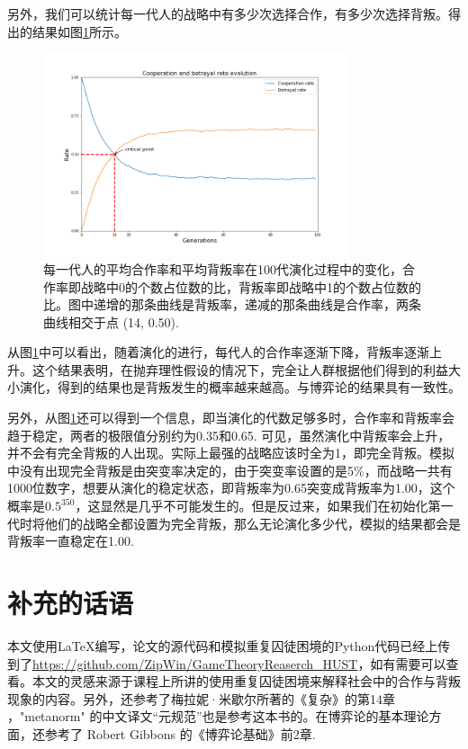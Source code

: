 \documentclass[lang=cn,11pt]{elegantpaper}
\begin{document}
另外，我们可以统计每一代人的战略中有多少次选择合作，有多少次选择背叛。得出的结果如图\ref{fig:信任进化曲线}所示。
\begin{figure}[!htb]
	\centering
	\includegraphics[width=0.8\textwidth]{figure/合作率的进化.png}
	\caption{ 每一代人的平均合作率和平均背叛率在100代演化过程中的变化，合作率即战略中0的个数占位数的比，背叛率即战略中1的个数占位数的比。图中递增的那条曲线是背叛率，递减的那条曲线是合作率，两条曲线相交于点 (14, 0.50).\label{fig:信任进化曲线}}
\end{figure}
从图\ref{fig:信任进化曲线}中可以看出，随着演化的进行，每代人的合作率逐渐下降，背叛率逐渐上升。这个结果表明，在抛弃理性假设的情况下，完全让人群根据他们得到的利益大小演化，得到的结果也是背叛发生的概率越来越高。与博弈论的结果具有一致性。

另外，从图\ref{fig:信任进化曲线}还可以得到一个信息，即当演化的代数足够多时，合作率和背叛率会趋于稳定，两者的极限值分别约为0.35和0.65. 可见，虽然演化中背叛率会上升，并不会有完全背叛的人出现。实际上最强的战略应该时全为1，即完全背叛。模拟中没有出现完全背叛是由突变率决定的，由于突变率设置的是5\%，而战略一共有1000位数字，想要从演化的稳定状态，即背叛率为0.65突变成背叛率为1.00，这个概率是$0.5^{350}$，这显然是几乎不可能发生的。但是反过来，如果我们在初始化第一代时将他们的战略全都设置为完全背叛，那么无论演化多少代，模拟的结果都会是背叛率一直稳定在1.00.

\section*{补充的话语}
本文使用\LaTeX 编写，论文的源代码和模拟重复囚徒困境的Python代码已经上传到了\url{https://github.com/ZipWin/GameTheoryReaserch\_HUST}，如有需要可以查看。本文的灵感来源于课程上所讲的使用重复囚徒困境来解释社会中的合作与背叛现象的内容。另外，还参考了梅拉妮·米歇尔所著的《复杂》的第14章
\cite{complex}，"metanorm" 的中文译文“元规范”也是参考这本书的。在博弈论的基本理论方面，还参考了 Robert Gibbons 的《博弈论基础》前2章\cite{game}.



\end{document}
